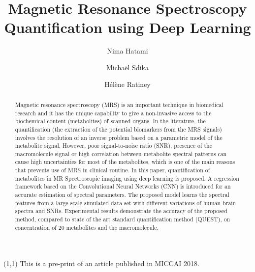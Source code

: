 \documentclass{llncs}
\begin{document}
\begin{textblock}{10}(1,1)
\noindent\tiny This is a pre-print of an article published in MICCAI 2018.
\end{textblock}

\title{Magnetic Resonance Spectroscopy Quantification using Deep Learning}
\author{Nima Hatami \and Micha\"el Sdika \and H\'el\`ene Ratiney}


   







\maketitle              %

\begin{abstract}
Magnetic resonance spectroscopy (MRS) is an important technique in biomedical research and it has the 
unique capability to give a non-invasive access to the biochemical content (metabolites) of scanned organs. 
In the literature, the quantification (the extraction of the potential biomarkers from the MRS 
signals) involves the resolution of an inverse problem based on a parametric model of 
the metabolite signal. However, poor signal-to-noise ratio (SNR), presence of the macromolecule signal or high correlation between metabolite spectral patterns can cause high uncertainties for most 
of the metabolites, which is one of the main reasons that prevents use of 
MRS in clinical routine. In this paper, quantification of metabolites in MR Spectroscopic imaging 
using deep learning is proposed. A regression framework based on the Convolutional Neural Networks (CNN) 
is introduced for an accurate estimation of spectral parameters. The proposed model learns the 
spectral features from a large-scale simulated data set with different variations of human brain 
spectra and SNRs. Experimental results demonstrate the accuracy of the proposed method, compared to 
state of the art standard quantification method (QUEST), on concentration of 20 metabolites and the macromolecule.    

\end{abstract}
\end{document}
